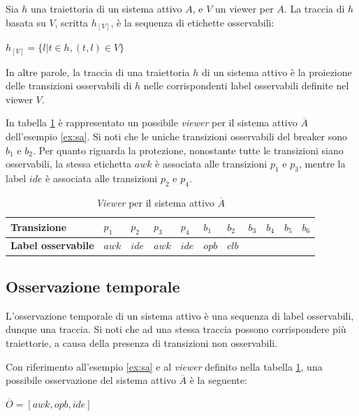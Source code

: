 \begin{defn}
Sia $h$ una traiettoria di un sistema attivo $A$, e $V$ un viewer per $A$. La traccia di $h$ basata su $V$, scritta $h_{[V]}$, è la sequenza di etichette osservabili:
\begin{center}
$h_{[V]} = \{l|t \in h, (t,l) \in V\}$
\end{center}
\end{defn}
In altre parole, la traccia di una traiettoria $h$ di un sistema attivo è la proiezione delle transizioni osservabili di $h$ nelle corrispondenti label osservabili definite nel viewer $V$.

\begin{ex}
In tabella \ref{tab:viewer} è rappresentato un possibile \emph{viewer} per il sistema attivo $\overline{A}$ dell'esempio \ref{ex:sa}. Si noti che le uniche transizioni osservabili del breaker sono $b_1$ e $b_2$. Per quanto riguarda la protezione, nonostante tutte le transizioni siano osservabili, la stessa etichetta $awk$ è associata alle transizioni $p_1$ e $p_3$, mentre la label $ide$ è associata alle transizioni $p_2$ e $p_4$. 
\end{ex}

\begin{table}[htbp] 
\begin{tabularx}{\textwidth}{l X X X X X X X X X X}
\hline
\textbf{Transizione} & $p_1$ & $p_2$ & $p_3$ & $p_4$ & $b_1$ & $b_2$ & $b_3$ & $b_4$ & $b_5$ & $b_6$\\
\hline
\textbf{Label osservabile} & $awk$ & $ide$ & $awk$ & $ide$ & $opb$ & $clb$ &  &  &  & \\
\hline
\end{tabularx}
\caption{\emph{Viewer} per il sistema attivo $\overline{A}$}
\label{tab:viewer}
\end{table}

\subsection{Osservazione temporale}
L'osservazione temporale di un sistema attivo è una sequenza di label osservabili, dunque una traccia.
Si noti che ad una stessa traccia possono corrispondere più traiettorie, a causa della presenza di transizioni non osservabili.

\begin{ex} \label{ex:oss}
Con riferimento all'esempio \ref{ex:sa} e al \emph{viewer} definito nella tabella \ref{tab:viewer}, una possibile osservazione del sistema attivo $\overline{A}$ è la seguente:
\begin{center}
$\overline{O} = [ awk, opb, ide] $
\end{center}
\end{ex}


